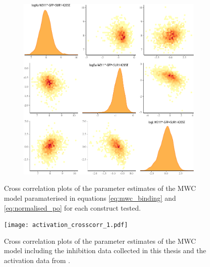 \begin{figure}[h]
\begin{subfigure}[t]{0.3\textwidth}
	\end{subfigure}
	\hfill
	\begin{subfigure}[t]{0.3\textwidth}
		\caption{}\label{apxfig:inhib_cc_9}
		\centering
		\includegraphics[width=\textwidth]{inhibition_crosscorr_9.pdf}
	\end{subfigure}
	\caption[MWC parameter cross-correlation - inhibition]{
	{\bf{}}
	Cross correlation plots of the parameter estimates of the MWC model paramaterised in equations \ref{eq:mwc_binding} and \ref{eq:normalised_po} for each construct tested.
	}
	\label{apxfig:inhibition_crosscorr}
\end{figure}

\begin{figure}[h]
	\centering
	\texttt{[image: activation\_crosscorr\_1.pdf]}
	\caption[MWC parameter cross-correlation - inhibition and activation]{
	{\bf{}}
	Cross correlation plots of the parameter estimates of the MWC model including the inhibition data collected in this thesis and the activation data from \textcite{puljung_activation_2019-1}.
	}
	\label{apxfig:activation_crosscorr}
\end{figure}